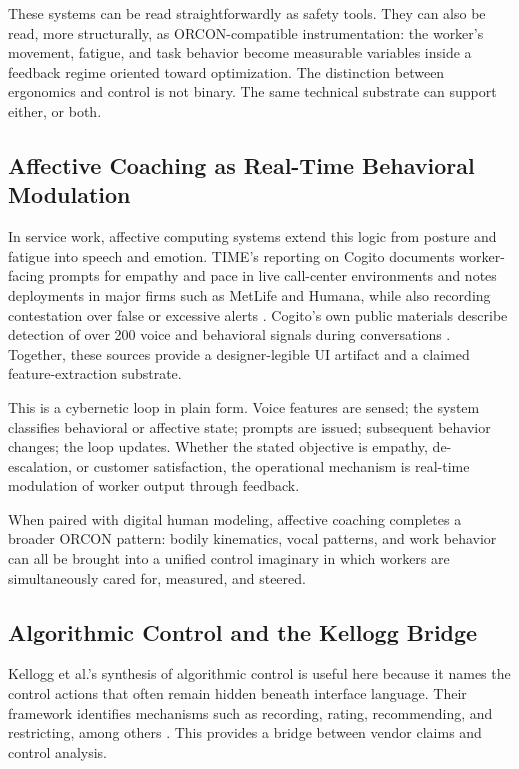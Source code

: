 \documentclass[runningheads]{llncs}
\begin{document}
These systems can be read straightforwardly as safety tools. They can also be read, more structurally, as ORCON-compatible instrumentation: the worker's movement, fatigue, and task behavior become measurable variables inside a feedback regime oriented toward optimization. The distinction between ergonomics and control is not binary. The same technical substrate can support either, or both.

\subsection{Affective Coaching as Real-Time Behavioral Modulation}

In service work, affective computing systems extend this logic from posture and fatigue into speech and emotion. TIME's reporting on Cogito documents worker-facing prompts for empathy and pace in live call-center environments and notes deployments in major firms such as MetLife and Humana, while also recording contestation over false or excessive alerts \cite{delagarza2019time}. Cogito's own public materials describe detection of over 200 voice and behavioral signals during conversations \cite{cogito2023businesswire}. Together, these sources provide a designer-legible UI artifact and a claimed feature-extraction substrate.

This is a cybernetic loop in plain form. Voice features are sensed; the system classifies behavioral or affective state; prompts are issued; subsequent behavior changes; the loop updates. Whether the stated objective is empathy, de-escalation, or customer satisfaction, the operational mechanism is real-time modulation of worker output through feedback.

When paired with digital human modeling, affective coaching completes a broader ORCON pattern: bodily kinematics, vocal patterns, and work behavior can all be brought into a unified control imaginary in which workers are simultaneously cared for, measured, and steered.

\subsection{Algorithmic Control and the Kellogg Bridge}

Kellogg et al.'s synthesis of algorithmic control is useful here because it names the control actions that often remain hidden beneath interface language. Their framework identifies mechanisms such as recording, rating, recommending, and restricting, among others \cite{kellogg2020algorithms}. This provides a bridge between vendor claims and control analysis.
\end{document}
